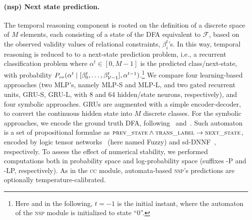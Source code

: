 \paragraph{{\sc (nsp)} Next state prediction.} The temporal reasoning component is rooted on the definition of a discrete space of $M$ elements, each consisting of a state of the DFA equivalent to $\mathcal{F}$, based on the observed validity values of relational constraints, $\beta_i^t$'s.
In this way, temporal reasoning is reduced to to a next-state prediction problem, i.e., a recurrent classification problem where $\alpha^t \in [0, M-1]$ is the predicted class/next-state, with probability $P_{\text{\sc\tiny nsp}}(\alpha^{t} \mid [\beta_{0}^{t}, \ldots, \beta_{\mathcal{V}-1}^{t}], \alpha^{t-1})$.\footnote{Here and in the following, $t = -1$ is the initial instant, where the automaton of the \textsc{nsp} module is initialized to state ``$0$''.} %
We compare four learning-based approaches (two MLP's, namely MLP-S and MLP-L, and two gated recurrent units, GRU-S, GRU-L, with 8 and 64 hidden/state neurons, respectively), and four symbolic approaches.
GRUs are augmented with a simple encoder-decoder, to convert the continuous hidden state into $M$ discrete classes.
For the symbolic approaches, we encode the ground truth DFA, following~\cite{umili2023grounding} and~\cite{manginas2024nesya}. %
Such automaton is a set of propositional formulae as $\textsc{\small prev\_state} \wedge \textsc{\small trans\_label} \rightarrow \textsc{\small next\_state}$, encoded by logic tensor networks~\cite{badreddine2022logic} (here named Fuzzy) and sd-DNNF~\cite{darwiche2002knowledge}, respectively. To assess the effect of numerical stability, we performed computations both in probability space and log-probability space (suffixes -P and -LP, respectively).
As in the \textsc{cc} module, automata-based \textsc{nsp}'s predictions are optionally temperature-calibrated.

